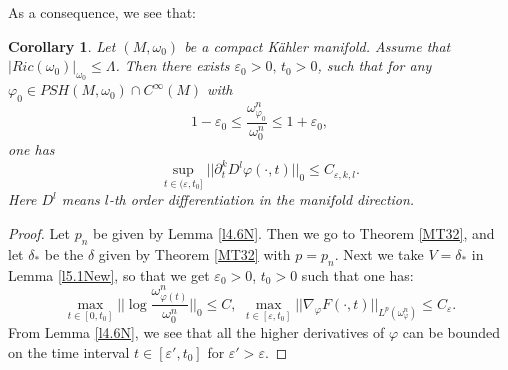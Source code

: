 \documentclass[11pt]{amsart}
\newtheorem{cor}[lem]{Corollary}
\numberwithin{equation}{section}
\newcommand \eps{\varepsilon}
\begin{document}
As a consequence,  we see that:
\begin{cor}\label{c5.2}
Let $(M,\omega_0)$ be a compact K\"ahler manifold.  Assume that $|Ric(\omega_0)|_{\omega_0}\le \Lambda$.  Then there exists $\eps_0>0,\,t_0>0$,  such that for any $\varphi_0\in PSH(M,\omega_0)\cap C^{\infty}(M)$ with
\begin{equation*}
1-\eps_0\le \frac{\omega_{\varphi_0}^n}{\omega_0^n}\le 1+\eps_0,
\end{equation*}
one has
\begin{equation*}
\sup_{t\in (\eps,t_0]}||\partial_t^kD^l\varphi(\cdot,t)||_0\le C_{\eps,k,l}.
\end{equation*}
Here $D^l$ means $l$-th order differentiation in the manifold direction.
\end{cor}
\begin{proof}
Let $p_n$ be given by Lemma \ref{l4.6N}.  Then we go to Theorem \ref{MT32},  and let $\delta_*$ be the $\delta$ given by Theorem \ref{MT32} with $p=p_n$.  Next we take $V=\delta_*$ in Lemma \ref{l5.1New},  so that we get $\eps_0>0$,  $t_0>0$ such that one has:
\begin{equation*}
\max_{t\in [0,t_0]}||\log\frac{\omega_{\varphi(t)}^n}{\omega_0^n}||_0\le C,\,\,\max_{t\in [\eps,t_0]}||\nabla_{\varphi}F(\cdot,t)||_{L^p(\omega_{\varphi}^n)}\le C_{\eps}.
\end{equation*}
From Lemma \ref{l4.6N},  we see that all the higher derivatives of $\varphi$ can be bounded on the time interval $t\in [\eps',t_0]$ for $\eps'>\eps$.
\end{proof}
\end{document}
